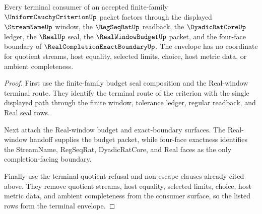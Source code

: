 \begin{theorem}
\label{thm:uniform-cauchy-criterion-terminal-seal-envelope}
Every terminal consumer of an accepted finite-family $\UniformCauchyCriterionUp$ packet factors through the displayed $\StreamNameUp$ window, the $\RegSeqRatUp$ readback, the $\DyadicRatCoreUp$ ledger, the $\RealUp$ seal, the $\RealWindowBudgetUp$ packet, and the four-face boundary of $\RealCompletionExactBoundaryUp$. The envelope has no coordinate for quotient streams, host equality, selected limits, choice, host metric data, or ambient completeness.
\end{theorem}
\begin{proof}
First use the finite-family budget seal composition and the Real-window terminal route. They identify the terminal route of the criterion with the single displayed path through the finite window, tolerance ledger, regular readback, and Real seal rows.

Next attach the Real-window budget and exact-boundary surfaces. The Real-window handoff supplies the budget packet, while four-face exactness identifies the StreamName, RegSeqRat, DyadicRatCore, and Real faces as the only completion-facing boundary.

Finally use the terminal quotient-refusal and non-escape clauses already cited above. They remove quotient streams, host equality, selected limits, choice, host metric data, and ambient completeness from the consumer surface, so the listed rows form the terminal envelope.
\end{proof}

